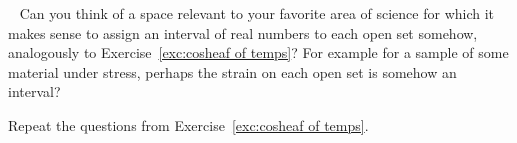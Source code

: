 \documentclass[../main/CT4S-EN-RU]{subfiles}
\begin{document}
\begin{exerciseRUS}\label{exc:cosheaf of temps}
\end{exerciseRUS}

\begin{exerciseENG}~
\sexc Can you think of a space relevant to your favorite area of science for which it makes sense to assign an interval of real numbers to each open set somehow, analogously to Exercise~\ref{exc:cosheaf of temps}? For example for a sample of some material under stress, perhaps the strain on each open set is somehow an interval? 
\item Repeat the questions from Exercise~\ref{exc:cosheaf of temps}.
\endsexc
\end{exerciseENG}

\begin{exerciseRUS}~
\end{exerciseRUS}
\end{document}
